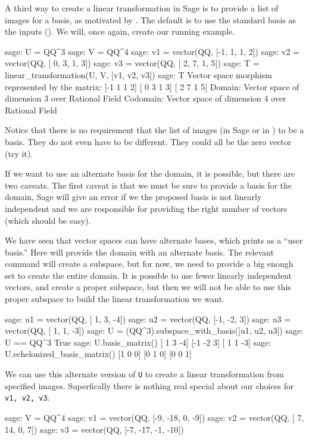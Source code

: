 A third way to create a linear transformation in Sage is to provide a list of images for a basis, as motivated by .  The default is to use the standard basis as the inputs ().
We will, once again, create our running example.
%
\begin{sageexample}
sage: U = QQ^3
sage: V = QQ^4
sage: v1 = vector(QQ, [-1, 1, 1, 2])
sage: v2 = vector(QQ, [ 0, 3, 1, 3])
sage: v3 = vector(QQ, [ 2, 7, 1, 5])
sage: T = linear_transformation(U, V, [v1, v2, v3])
sage: T
Vector space morphism represented by the matrix:
[-1  1  1  2]
[ 0  3  1  3]
[ 2  7  1  5]
Domain: Vector space of dimension 3 over Rational Field
Codomain: Vector space of dimension 4 over Rational Field
\end{sageexample}
%
Notice that there is no requirement that the list of images (in Sage or in ) to be a basis.  They do not even have to be different.  They could all be the zero vector (try it).\par
%
If we want to use an alternate basis for the domain, it is possible, but there are two caveats.  The first caveat is that we must be sure to provide a basis for the domain, Sage will give an error if we the proposed basis is not linearly independent and we are responsible for providing the right number of vectors (which should be easy).\par
%
We have seen that vector spaces can have alternate bases, which prints as a ``user basis.''  Here will provide the domain with an alternate basis.  The relevant command will create a subspace, but for now, we need to provide a big enough set to create the entire domain.  It is possible to use fewer linearly independent vectors, and create a proper subspace, but then we will not be able to use this proper subspace to build the linear transformation we want.
%
\begin{sageexample}
sage: u1 = vector(QQ, [ 1,  3, -4])
sage: u2 = vector(QQ, [-1, -2,  3])
sage: u3 = vector(QQ, [ 1,  1, -3])
sage: U = (QQ^3).subspace_with_basis([u1, u2, u3])
sage: U == QQ^3
True
sage: U.basis_matrix()
[ 1  3 -4]
[-1 -2  3]
[ 1  1 -3]
sage: U.echelonized_basis_matrix()
[1 0 0]
[0 1 0]
[0 0 1]
\end{sageexample}
%
We can use this alternate version of \verb?U? to create a linear transformation from specified images.  Superfically there is nothing real special about our choices for \verb?v1, v2, v3?.
%
\begin{sageexample}
sage: V = QQ^4
sage: v1 = vector(QQ, [-9, -18,  0, -9])
sage: v2 = vector(QQ, [ 7,  14,  0,  7])
sage: v3 = vector(QQ, [-7, -17, -1, -10])
\end{sageexample}
